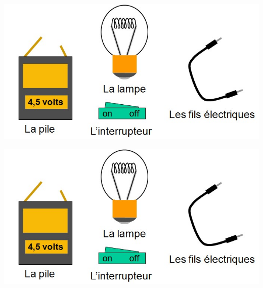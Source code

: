 \documentclass[12pt,a4paper]{article}
\begin{document}
\begin{multicols}{2}
\begin{center}
	\includegraphics[scale=0.45]{img/dipoles}
\end{center}

\begin{center}
	\includegraphics[scale=0.45]{img/dipoles}
\end{center}


\end{multicols}

\newpage
\end{document}
